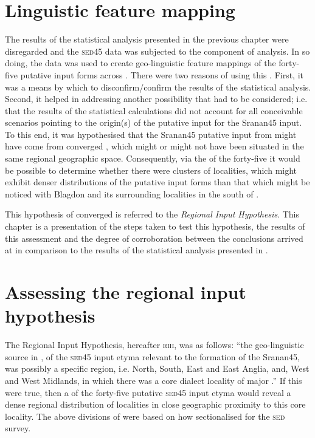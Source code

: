 \section{ Linguistic feature mapping} \label{5.2}
The results of the statistical analysis presented in the previous chapter were disregarded and the \textsc{sed45} data was subjected to the  component of analysis. In so doing, the data was used to create geo-linguistic feature mappings of the forty-five putative input forms across . There were two reasons of using this . First, it was a means by which to disconfirm/confirm the results of the statistical analysis. Second, it helped in addressing another possibility that had to be considered; i.e. that the results of the statistical calculations did not account for all conceivable scenarios pointing to the origin(s) of the putative input for the Sranan45 input. To this end, it was hypothesised that the Sranan45 putative input from  might have come from converged , which might or might not have been situated in the same regional geographic space. Consequently, via the  of the forty-five  it would be possible to determine whether there were clusters of localities, which might exhibit denser distributions of the putative input forms than that which might be noticed with Blagdon and its surrounding localities in the south of .

This hypothesis of converged  is referred to the \emph{Regional Input Hypothesis}. This chapter is a presentation of the steps taken to test this hypothesis, the results of this assessment and the degree of corroboration between the conclusions arrived at in comparison to the results of the statistical analysis presented in .

\section{Assessing the regional input hypothesis}\label{5.3}
The Regional Input Hypothesis, hereafter \textsc{rih}, was as follows: ``the geo-linguistic source in , of the \textsc{sed45} input etyma relevant to the formation of the Sranan45, was possibly a specific region, i.e. North, South, East and East Anglia, and, West and West Midlands, in which there was a core dialect locality of major .'' If this were true, then a  of the forty-five putative \textsc{sed45} input etyma would reveal a dense regional distribution of localities in close geographic proximity to this core locality. The above divisions of  were based on how  \citet{Orton6271} sectionalised  for the \textsc{\textsc{sed}} survey.

